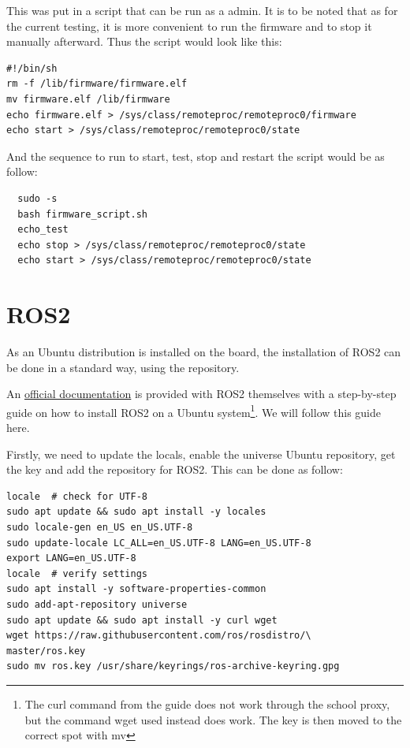 \documentclass[10pt]{article}
\begin{document}
This was put in a script that can be run as a admin.
It is to be noted that as for the current testing, it is more convenient
to run the firmware and to stop it manually afterward.
Thus the script would look like this:
\begin{tcolorbox}
\begin{verbatim}
#!/bin/sh
rm -f /lib/firmware/firmware.elf
mv firmware.elf /lib/firmware
echo firmware.elf > /sys/class/remoteproc/remoteproc0/firmware
echo start > /sys/class/remoteproc/remoteproc0/state
\end{verbatim}
\end{tcolorbox}

And the sequence to run to start, test, stop and restart the script would be
as follow:
\begin{tcolorbox}
\begin{verbatim}
  sudo -s
  bash firmware_script.sh
  echo_test
  echo stop > /sys/class/remoteproc/remoteproc0/state
  echo start > /sys/class/remoteproc/remoteproc0/state
\end{verbatim}
\end{tcolorbox}


\pagebreak
\section{ROS2}
\label{sec:ros2}
As an Ubuntu distribution is installed on the board, the installation of ROS2
can be done in a standard way, using the repository.

An \href{https://docs.ros.org/en/humble/Installation/Ubuntu-Install-Debians.html}{official documentation}
is provided with ROS2 themselves with a step-by-step guide on how to install
ROS2 on a Ubuntu system\footnote{The curl command from the guide does not work through the school proxy,
  but the command wget used instead does work. The key is then moved to the correct spot with mv}.
We will follow this guide here.

Firstly, we need to update the locals, enable the universe Ubuntu repository,
get the key and add the repository for ROS2. This can be done as follow:

\begin{tcolorbox}
\begin{verbatim}
locale  # check for UTF-8
sudo apt update && sudo apt install -y locales
sudo locale-gen en_US en_US.UTF-8
sudo update-locale LC_ALL=en_US.UTF-8 LANG=en_US.UTF-8
export LANG=en_US.UTF-8
locale  # verify settings
sudo apt install -y software-properties-common
sudo add-apt-repository universe
sudo apt update && sudo apt install -y curl wget
wget https://raw.githubusercontent.com/ros/rosdistro/\
master/ros.key
sudo mv ros.key /usr/share/keyrings/ros-archive-keyring.gpg
\end{verbatim}
\end{tcolorbox}
\end{document}
